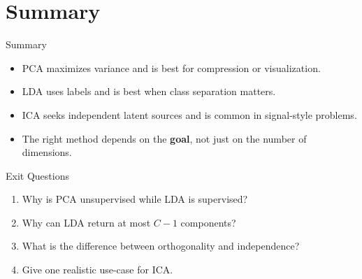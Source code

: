 \documentclass[aspectratio=169]{beamer}
\begin{document}
\section{Summary}

\begin{frame}{Summary}
  \begin{itemize}
    \item PCA maximizes variance and is best for compression or visualization.
    \item LDA uses labels and is best when class separation matters.
    \item ICA seeks independent latent sources and is common in signal-style problems.
    \item The right method depends on the \textbf{goal}, not just on the number of dimensions.
  \end{itemize}
  \slidesources{\AIMLMiscSources}
\end{frame}

\begin{frame}{Exit Questions}
  \begin{enumerate}
    \item Why is PCA unsupervised while LDA is supervised?
    \item Why can LDA return at most $C-1$ components?
    \item What is the difference between orthogonality and independence?
    \item Give one realistic use-case for ICA.
  \end{enumerate}
\end{frame}
\end{document}
